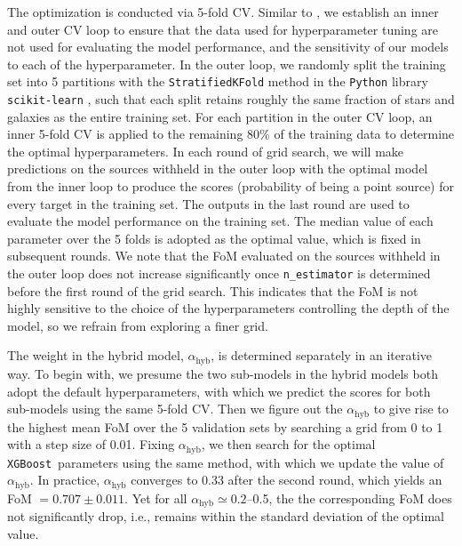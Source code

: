 \documentclass[twocolumn]{aastex631}
\newcommand{\xgboost}{\texttt{XGBoost}}
\begin{document}
\begin{CJK*}{UTF8}{gbsn}
The optimization is conducted via 5-fold CV. Similar to , we establish an inner and outer CV loop to ensure that the data used for hyperparameter tuning are not used for evaluating the model performance, and the sensitivity of our models to each of the hyperparameter. In the outer loop, we randomly split the training set into 5 partitions with the \texttt{StratifiedKFold} method in the \texttt{Python} library \texttt{scikit-learn} \citep{scikit-learn}, such that each split retains roughly the same fraction of stars and galaxies as the entire training set. For each partition in the outer CV loop, an inner 5-fold CV is applied to the remaining 80\% of the training data to determine the optimal hyperparameters. 
In each round of grid search, we will make predictions on the sources withheld in the outer loop with the optimal model from the inner loop to produce the scores (probability of being a point source) for every target in the training set. The outputs in the last round are used to evaluate the model performance on the training set. 
The median value of each parameter over the 5 folds is adopted as the optimal value, which is fixed in subsequent rounds. 
We note that the FoM evaluated on the sources withheld in the outer loop does not increase significantly once \texttt{n\_estimator} is determined before the first round of the grid search.
This indicates that the FoM is not highly sensitive to the choice of the hyperparameters controlling the depth of the model, so we refrain from exploring a finer grid.

The weight in the hybrid model, $\alpha_\mathrm{hyb}$, is determined separately in an iterative way. To begin with, we presume the two sub-models in the hybrid models both adopt the default hyperparameters, with which we predict the scores for both sub-models using the same 5-fold CV. Then we figure out the $\alpha_\mathrm{hyb}$ to give rise to the highest mean FoM over the 5 validation sets by searching a grid from 0 to 1 with a step size of 0.01. Fixing $\alpha_\mathrm{hyb}$, we then search for the optimal \xgboost\ parameters using the same method, with which we update the value of $\alpha_\mathrm{hyb}$. In practice, $\alpha_\mathrm{hyb}$ converges to 0.33 after the second round, which yields an FoM $= 0.707\pm0.011$. Yet for all $\alpha_\mathrm{hyb}\simeq0.2$--0.5, the the corresponding FoM does not significantly drop, i.e., remains within the standard deviation of the optimal value.


\end{CJK*}
\end{document}
